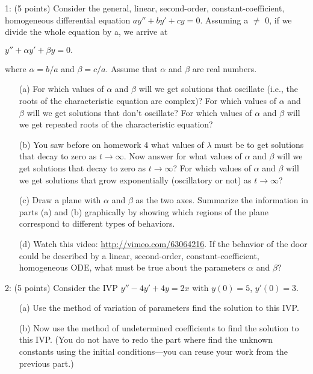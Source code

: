 \documentclass[12pt,letterpaper]{hmcpset}
\begin{document}
\begin{problem}
1: (5 points) Consider the general, linear, second-order, constant-coefficient, homogeneous differential
equation $ay'' + by' + cy = 0$. Assuming a $\neq$ 0, if we divide the whole equation by a,
we arrive at

\begin{center}
    $y'' + \alpha y' + \beta y = 0.$
\end{center}
where $\alpha = b/a$ and $\beta = c/a$. Assume that $\alpha$ and $\beta$ are real numbers.

\begin{enumerate}
    \item[(a)] For which values of $\alpha$ and $\beta$ will we get solutions that oscillate (i.e., the roots of the
characteristic equation are complex)? For which values of $\alpha$ and $\beta$ will we get solutions
that don’t oscillate? For which values of $\alpha$ and $\beta$ will we get repeated roots of the
characteristic equation?
    \item[(b)] You saw before on homework 4 what values of $\lambda$ must be to get solutions that decay
to zero as $t \rightarrow \infty$. Now answer for what values of $\alpha$ and $\beta$ will we get solutions that
decay to zero as $t \rightarrow \infty$? For which values of $\alpha$ and $\beta$ will we get solutions that grow
exponentially (oscillatory or not) as $t \rightarrow \infty$?
    \item[(c)] Draw a plane with $\alpha$ and $\beta$ as the two axes. Summarize the information in parts (a)
and (b) graphically by showing which regions of the plane correspond to different types
of behaviors.
    \item[(d)] Watch this video: 
    \url{http://vimeo.com/63064216}. 
    If the behavior of the door could be
described by a linear, second-order, constant-coefficient, homogeneous ODE, what must
be true about the parameters $\alpha$ and $\beta$?
\end{enumerate}

\end{problem}
\newpage

\begin{problem}
2: (5 points) Consider the IVP $y'' - 4y' + 4y = 2x$ with $y(0) = 5$, $y'(0) = 3$.

\begin{enumerate}
    \item[(a)] Use the method of variation of parameters find the solution to this IVP.
    \item[(b)] Now use the method of undetermined coefficients to find the solution to this IVP.
(You do not have to redo the part where find the unknown constants using the initial
conditions—you can reuse your work from the previous part.)
\end{enumerate}
\end{problem}
\newpage
\end{document}

